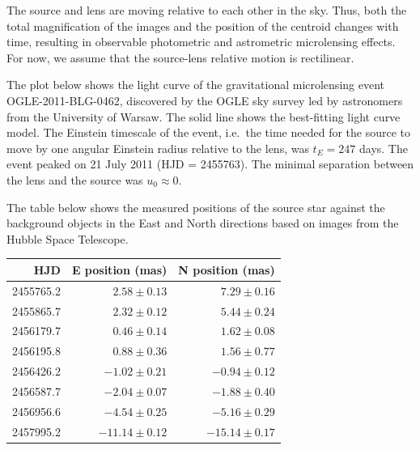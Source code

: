 The source and lens are moving relative to each other in the sky. Thus, both
the total magnification of the images and the position of the centroid changes
with time, resulting in observable photometric and astrometric microlensing
effects. For now, we assume that the source-lens relative motion is
rectilinear.

The plot below shows the light curve of the gravitational microlensing event
OGLE-2011-BLG-0462, discovered by the OGLE sky survey led by astronomers from
the University of Warsaw. The solid line shows the best-fitting light curve
model. The Einstein timescale of the event, i.e.\ the time needed for the
source to move by one angular Einstein radius relative to the lens, was
$t_E = 247$ days. The event peaked on 21 July 2011 (HJD = 2455763). The
minimal separation between the lens and the source was $u_0 \approx 0$.


The table below shows the measured positions of the source star against the
background objects in the East and North directions based on images from the
Hubble Space Telescope.

\begin{center}
\begin{tabular}{rrr}
\toprule
HJD & E position (mas) & N position (mas) \\
\midrule
2455765.2 & $2.58 \pm 0.13$ & $7.29 \pm 0.16$ \\
2455865.7 & $2.32 \pm 0.12$ & $5.44 \pm 0.24$ \\
2456179.7 & $0.46 \pm 0.14$ & $1.62 \pm 0.08$ \\
2456195.8 & $0.88 \pm 0.36$ & $1.56 \pm 0.77$ \\
2456426.2 & $-1.02 \pm 0.21$ & $-0.94 \pm 0.12$ \\
2456587.7 & $-2.04 \pm 0.07$ & $-1.88 \pm 0.40$ \\
2456956.6 & $-4.54 \pm 0.25$ & $-5.16 \pm 0.29$ \\
2457995.2 & $-11.14 \pm 0.12$ & $-15.14 \pm 0.17$ \\
\bottomrule
\end{tabular}
\end{center}

